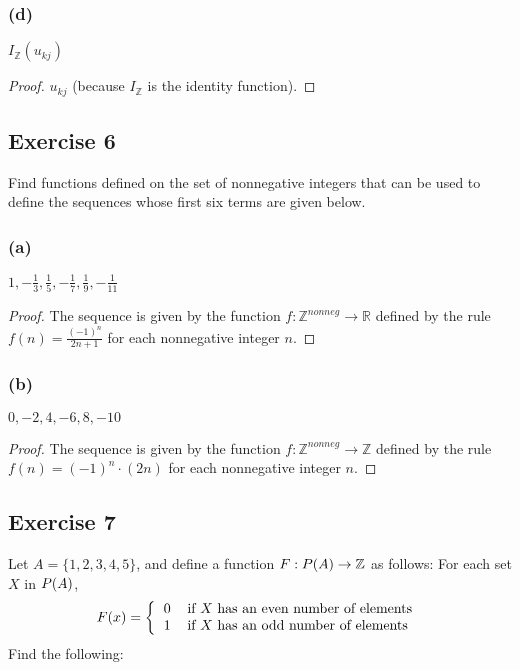 \documentclass[14pt]{extarticle}
\let\mathscr\relax
\newcommand{\ps}{\mathscr{P}} %
\newcommand{\dps}{\displaystyle}
\newcommand{\R}{\mathbb{R}}
\newcommand{\Z}{\mathbb{Z}}
\newcommand{\cy}{\color{cyan}}
\begin{document}
\subsubsection{(d)}
\(I_{\Z}(u_{kj})\)

\begin{proof}
    $u_{kj}$ (because \(I_{\Z}\) is the identity function).
\end{proof}

\subsection{Exercise 6}
Find functions defined on the set of nonnegative integers that can be used to define the sequences whose first six
terms are given below.

\subsubsection{(a)}
\(\dps 1, -\frac{1}{3}, \frac{1}{5}, -\frac{1}{7}, \frac{1}{9}, -\frac{1}{11}\)

\begin{proof}
    The sequence is given by the function \(f: \Z^{nonneg} \to \R\) defined by the rule \(\dps f(n)=\frac{(-1)^n}{2n+1}\)
    {\cy for each nonnegative integer $n$.}
\end{proof}

\subsubsection{(b)}
\(0, -2, 4, -6, 8, -10\)

\begin{proof}
    The sequence is given by the function \(f: \Z^{nonneg} \to \Z\) defined by the rule \(\dps f(n) = (-1)^n \cdot (2n)\)
    {\cy for each nonnegative integer $n$.}
\end{proof}

\subsection{Exercise 7}
Let \(A = \{1, 2, 3, 4, 5\}\), and define a function \(F: \ps(A) \to \Z\) as follows: For each set $X$ in $\ps(A)$,
\[
    F(x) =
    \left\{
    \begin{tabular}{ll}
        \(0\) & if $X$ has an even number of elements \\
        \(1\) & if $X$ has an odd number of elements
    \end{tabular}
    \right.
\]
Find the following:
\end{document}
